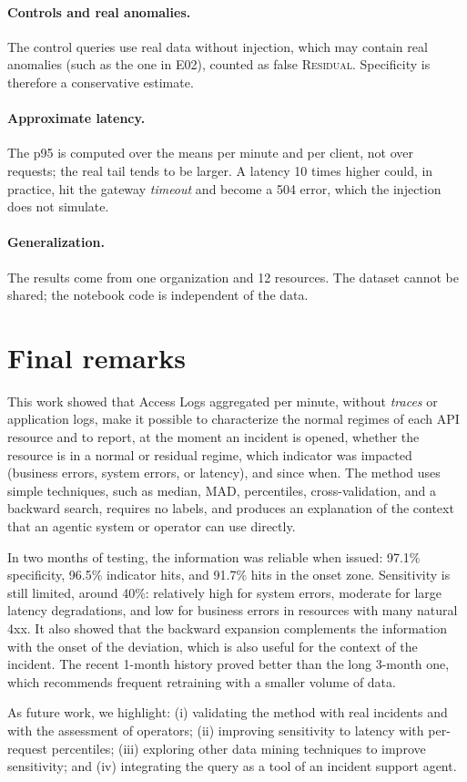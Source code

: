 \documentclass[sigconf,nonacm]{acmart}
\newcommand{\Residual}{\textsc{Residual}\xspace}
\begin{document}
\paragraph{Controls and real anomalies.} The control queries use real data without injection, which may contain real anomalies (such as the one in E02), counted as false \Residual. Specificity is therefore a conservative estimate.

\paragraph{Approximate latency.} The p95 is computed over the means per minute and per client, not over requests; the real tail tends to be larger. A latency 10 times higher could, in practice, hit the gateway \emph{timeout} and become a 504 error, which the injection does not simulate.

\paragraph{Generalization.} The results come from one organization and 12 resources. The dataset cannot be shared; the notebook code is independent of the data.

\section{Final remarks}\label{sec:conclusao}

This work showed that Access Logs aggregated per minute, without \emph{traces} or application logs, make it possible to characterize the normal regimes of each API resource and to report, at the moment an incident is opened, whether the resource is in a normal or residual regime, which indicator was impacted (business errors, system errors, or latency), and since when. The method uses simple techniques, such as median, MAD, percentiles, cross-validation, and a backward search, requires no labels, and produces an explanation of the context that an agentic system or operator can use directly.

In two months of testing, the information was reliable when issued: 97.1\% specificity, 96.5\% indicator hits, and 91.7\% hits in the onset zone. Sensitivity is still limited, around 40\%: relatively high for system errors, moderate for large latency degradations, and low for business errors in resources with many natural 4xx. It also showed that the backward expansion complements the information with the onset of the deviation, which is also useful for the context of the incident. The recent 1-month history proved better than the long 3-month one, which recommends frequent retraining with a smaller volume of data.

As future work, we highlight: (i) validating the method with real incidents and with the assessment of operators; (ii) improving sensitivity to latency with per-request percentiles; (iii) exploring other data mining techniques to improve sensitivity; and (iv) integrating the query as a tool of an incident support agent.



\end{document}
